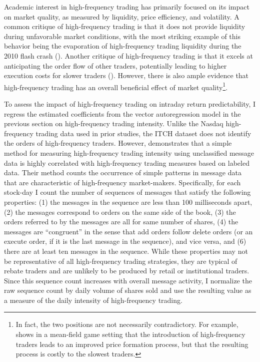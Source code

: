 	Academic interest in high-frequency trading has primarily focused on its impact on market quality, as measured by liquidity, price efficiency, and volatility. A common critique of high-frequency trading is that it does not provide liquidity during unfavorable market conditions, with the most striking example of this behavior being the evaporation of high-frequency trading liquidity during the 2010 flash crash (\citet{Kirilenko2015}). Another critique of high-frequency trading is that it excels at anticipating the order flow of other traders, potentially leading to higher execution costs for slower traders (\citet{Hirschey2013}). However, there is also ample evidence that high-frequency trading has an overall beneficial effect of market quality\footnote{In fact, the two positions are not necessarily contradictory. For example, \citet{Lachapelle2013} shows in a mean-field game setting that the introduction of high-frequency traders leads to an improved price formation process, but that the resulting process is costly to the slowest traders.}.

	To assess the impact of high-frequency trading on intraday return predictability, I regress the estimated coefficients from the vector autoregression model in the previous section on high-frequency trading intensity. Unlike the Nasdaq high-frequency trading data used in prior studies, the ITCH dataset does not identify the orders of high-frequency traders. However, \citet{Hasbrouck2013} demonstrates that a simple method for measuring high-frequency trading intensity using unclassified message data is highly correlated with high-frequency trading measures based on labeled data. Their method counts the occurrence of simple patterns in message data that are characteristic of high-frequency market-makers. Specifically, for each stock-day I count the number of sequences of messages that satisfy the following properties: (1) the messages in the sequence are less than 100 milliseconds apart, (2) the messages correspond to orders on the same side of the book, (3) the orders referred to by the messages are all for same number of shares, (4) the messages are ``congruent'' in the sense that add orders follow delete orders (or an execute order, if it is the last message in the sequence), and vice versa, and (6) there are at least ten messages in the sequence. While these properties may not be representative of all high-frequency trading strategies, they are typical of rebate traders and are unlikely to be produced by retail or institutional traders. Since this sequence count increases with overall message activity, I normalize the raw sequence count by daily volume of shares sold and use the resulting value as a measure of the daily intensity of high-frequency trading.

